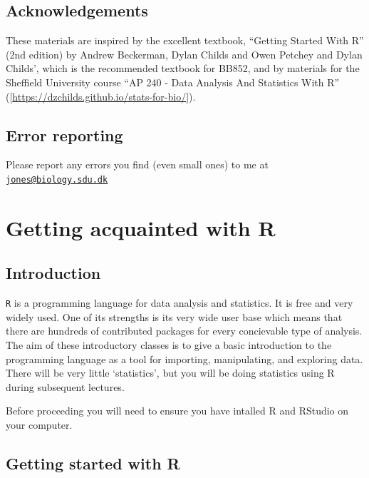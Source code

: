 \documentclass[
  a4paperpaper,
]{book}
\begin{document}
\hypertarget{acknowledgements}{%
\section{Acknowledgements}\label{acknowledgements}}

These materials are inspired by the excellent textbook, ``Getting Started With R'' (2nd edition) by Andrew Beckerman, Dylan Childs and Owen Petchey and Dylan Childs', which is the recommended textbook for BB852, and by materials for the Sheffield University course ``AP 240 - Data Analysis And Statistics With R'' ({[}\url{https://dzchilds.github.io/stats-for-bio/}{]}).

\hypertarget{error-reporting}{%
\section{Error reporting}\label{error-reporting}}

Please report any errors you find (even small ones) to me at \href{mailto:jones@biology.sdu.dk}{\nolinkurl{jones@biology.sdu.dk}}

\hypertarget{getting-acquainted-with-r}{%
\chapter{Getting acquainted with R}\label{getting-acquainted-with-r}}

\hypertarget{introduction}{%
\section{Introduction}\label{introduction}}

\texttt{R} is a programming language for data analysis and statistics. It is free and very widely used. One of its strengths is its very wide user base which means that there are hundreds of contributed packages for every concievable type of analysis. The aim of these introductory classes is to give a basic introduction to the programming language as a tool for importing, manipulating, and exploring data. There will be very little `statistics', but you will be doing statistics using R during subsequent lectures.

Before proceeding you will need to ensure you have intalled R and RStudio on your computer.

\hypertarget{getting-started-with-r}{%
\section{Getting started with R}\label{getting-started-with-r}}
\end{document}
